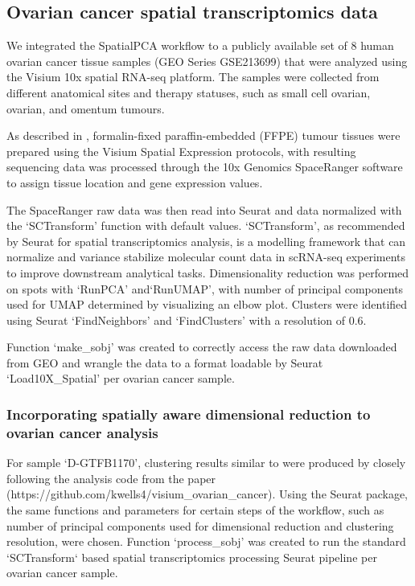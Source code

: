 \documentclass{article}
\begin{document}
\subsection*{Ovarian cancer spatial transcriptomics data}

We integrated the SpatialPCA workflow to a publicly available set of 8 human ovarian cancer tissue samples (GEO Series GSE213699) that were analyzed using the Visium 10x spatial RNA-seq platform. The samples were collected from different anatomical sites and therapy statuses, such as small cell ovarian, ovarian, and omentum tumours.

As described in \citet{sanders_small_2022}, formalin-fixed paraffin-embedded (FFPE) tumour tissues were prepared using the Visium Spatial Expression protocols, with resulting sequencing data was processed through the 10x Genomics SpaceRanger software to assign tissue location and gene expression values.

The SpaceRanger raw data was then read into Seurat \citep{hao2021} and data normalized with the `SCTransform' function with default values. `SCTransform'\citep{choudhary_comparison_2022}, as recommended by Seurat for spatial transcriptomics analysis, is a modelling framework that can normalize and variance stabilize molecular count data in scRNA-seq experiments to improve downstream analytical tasks. Dimensionality reduction was performed on spots with `RunPCA' and`RunUMAP', with number of principal components used for UMAP determined by visualizing an elbow plot. Clusters were identified using Seurat `FindNeighbors' and `FindClusters' with a resolution of 0.6.

Function `make\_sobj' was created to correctly access the raw data downloaded from GEO and wrangle the data to a format loadable by Seurat `Load10X\_Spatial' per ovarian cancer sample.

\subsubsection*{Incorporating spatially aware dimensional reduction to ovarian cancer analysis}

For sample `D-GTFB1170', clustering results similar to \citet{sanders_small_2022} were produced by closely following the analysis code from the paper (https://github.com/kwells4/visium\_ovarian\_cancer). Using the Seurat package, the same functions and parameters for certain steps of the workflow, such as number of principal components used for dimensional reduction and clustering resolution, were chosen. Function `process\_sobj' was created to run the standard `SCTransform` based spatial transcriptomics processing Seurat pipeline per ovarian cancer sample.
\end{document}
